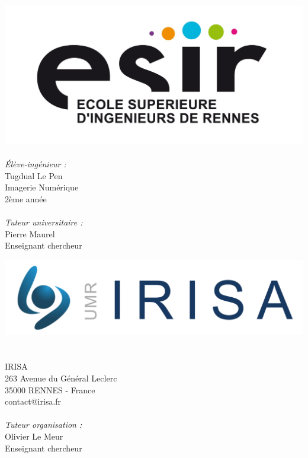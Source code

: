 \begin{titlepage}
  \begin{center}

    \begin{minipage}{0.45\textwidth}
      \begin{flushleft} \large
        \includegraphics[width=0.9\columnwidth]{datas/logo_esir.jpg}~\\
        \emph{Élève-ingénieur :}\\
        Tugdual Le Pen\\
        Imagerie Numérique\\
        2ème année\\
        ~\\
        \emph{Tuteur universitaire :}\\
        Pierre Maurel\\
        Enseignant chercheur
      \end{flushleft}
    \end{minipage}
    \begin{minipage}{0.45\textwidth}
      \begin{flushright} \large
        \vspace{19pt}
        \includegraphics[width=0.9\columnwidth]{datas/logo_irisa.jpg}~\\~\\
        IRISA\\
        263 Avenue du Général Leclerc\\
        35000 RENNES - France\\
        contact@irisa.fr\\
        ~\\        
        \emph{Tuteur organisation :}\\
        Olivier Le Meur\\
        Enseignant chercheur\\
      \end{flushright}
    \end{minipage}


\end{center}
\end{titlepage}
